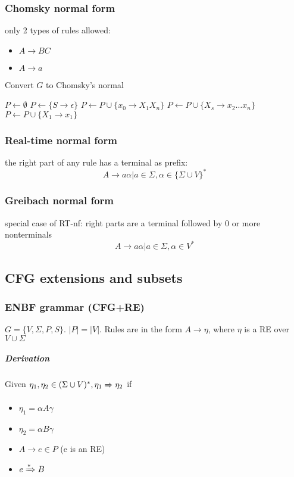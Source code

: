 \documentclass{article}
\newcommand{\derives}[1][ ]{\xRightarrow{#1}}
\begin{document}
\subsubsection{Chomsky normal form} only 2 types of rules allowed:
\begin{itemize}
	\item $A\to BC$
	\item $A\to a$
\end{itemize}
\begin{algorithm}
\caption{Convert $G$  to Chomsky's normal}
\begin{algorithmic}
\STATE$P \leftarrow \emptyset$
	\STATE $P \leftarrow \{S\to \epsilon\}$
\ENDIF
{}
	\STATE $P \leftarrow P\cup \{x_0 \to X_1X_n\}$ 
	\STATE $P \leftarrow P \cup \{X_s \to x_2\dots x_n\}$
\ENDFOR
{}
	\STATE $P \leftarrow P \cup \{X_1 \to x_1\}$
\ENDIF
\end{algorithmic}
\end{algorithm}
\subsubsection{Real-time normal form} the right part of any rule has a terminal as prefix:
\[
A \to a\alpha|a \in \Sigma, \alpha \in \{\Sigma \cup V\}^*
\]
\subsubsection{Greibach normal form} special case of RT-nf: right parts are a terminal followed by 0 or more nonterminals
\[
A \to a\alpha|a \in \Sigma, \alpha \in V^*
\]



\subsection{CFG extensions and subsets}
\subsubsection{ENBF grammar (CFG+RE)} $G=\{V,\Sigma,P,S\}$. $|P|=|V|$. Rules are in the form $A\to \eta$, where $\eta$ is a RE over $V \cup \Sigma$
\subparagraph{Derivation} Given $\eta_1, \eta_2 \in (\Sigma \cup V)^*, \eta_1 \derives \eta_2$ if 
\begin{itemize}
	\item $\eta_1=\alpha A\gamma$
	\item $\eta_2=\alpha B \gamma$
	\item $A \to e \in P$ (e is an RE)
	\item $e \derives[*] B$
\end{itemize}
\end{document}

